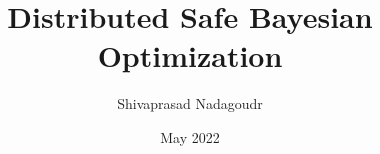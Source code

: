\documentclass[mtech,project]{iist}
\title{Distributed Safe Bayesian Optimization}
\author{Shivaprasad Nadagoudr}
\date{May 2022}
\begin{document}
\maketitle %
\makecertificate %
\makedeclaration %
\makeacknowledgements %
\makeabstract %
\maketableofcontents %
\makelistoffigures %
\makelistofalgorithms %

\makechaptersettings 









\makebibsettings




\makeappendixsettings
%
%

\makeindexsettings
\end{document}
